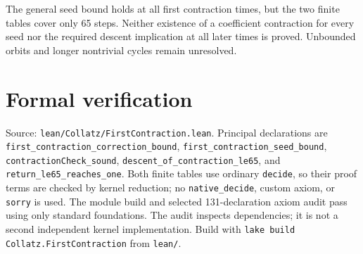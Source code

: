 \documentclass[10pt]{article}
\begin{document}
The general seed bound holds at all first contraction times, but the two
finite tables cover only 65 steps. Neither existence of a coefficient
contraction for every seed nor the required descent implication at all
later times is proved. Unbounded orbits and longer nontrivial cycles remain
unresolved.

\section{Formal verification}
{\raggedright
Source: \texttt{lean/Collatz/FirstContraction.lean}. Principal declarations
are \texttt{first\_contraction\_correction\_bound},
\texttt{first\_contraction\_seed\_bound},
\texttt{contractionCheck\_sound},
\texttt{descent\_of\_contraction\_le65}, and
\texttt{return\_le65\_reaches\_one}. Both finite tables use ordinary
\texttt{decide}, so their proof terms are checked by kernel reduction;
no \texttt{native\_decide}, custom axiom, or \texttt{sorry} is used.
The module build and selected 131-declaration axiom audit pass using only
standard foundations. The audit inspects dependencies; it is not a second
independent kernel implementation. Build with
\texttt{lake build Collatz.FirstContraction} from \texttt{lean/}.\par}
\end{document}
